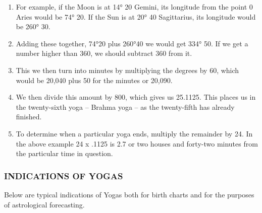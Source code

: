 \begin{enumerate}
\begin{enumerate}
 

\item[] For example, if the Moon is at 14° 20 Gemini, its longitude from the point 0 Aries would be 74° 20. If the Sun is at 20° 40 Sagittarius, its longitude would be 260° 30.

 

\item[] Adding these together, 74°20 plus 260°40 we would get 334° 50. If we get a number higher than 360, we should subtract 360 from it.

 

\item[] This we then turn into minutes by multiplying the degrees by 60, which would be 20,040 plus 50 for the minutes or 20,090.

 

\item[] We then divide this amount by 800, which gives us 25.1125. This places us in the twenty-sixth yoga – Brahma yoga – as the twenty-fifth has already finished.

 

\item[] To determine when a particular yoga ends, multiply the remainder by 24. In the above example 24 x .1125 is 2.7 or two houses and forty-two minutes from the particular time in question.

 \end{enumerate}

\subsubsection{INDICATIONS OF YOGAS}
 

Below are typical indications of Yogas both for birth charts and for the purposes of astrological forecasting.


\end{enumerate}
